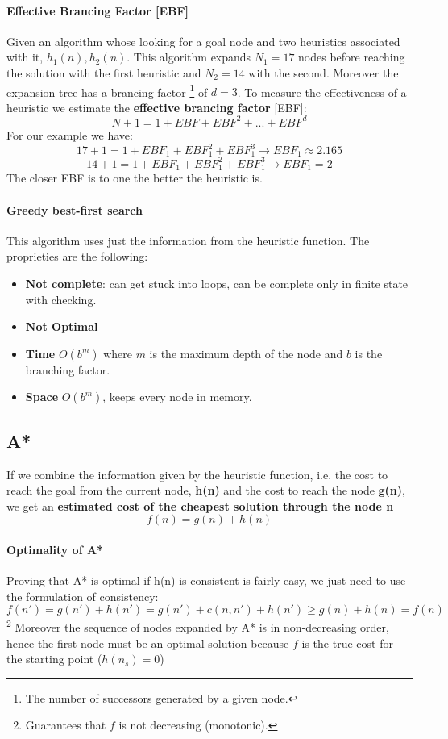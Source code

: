 \documentclass[10pt,a4paper]{article}
\begin{document}
\paragraph{Effective Brancing Factor [EBF]}
Given an algorithm whose looking for a goal node and two heuristics associated with it, $h_1(n),h_2(n)$. This algorithm expands $N_1=17$ nodes before reaching the solution with the first heuristic and $N_2=14$ with the second. Moreover the expansion tree has a brancing factor  \footnote{The number of successors generated by a given node.} of $d=3$. To measure the effectiveness of a heuristic we estimate the \textbf{effective brancing factor} [EBF]:
\[N+1=1+EBF+EBF^2+...+EBF^d\]
For our example we have:
\[17+1=1+EBF_1+EBF^2_1+EBF_1^3\rightarrow EBF_1\approx 2.165\] 
\[14+1=1+EBF_1+EBF^2_1+EBF_1^3\rightarrow EBF_1= 2\]
The closer EBF is to one the better the heuristic is.

\paragraph{Greedy best-first search}
This algorithm uses just the information from the heuristic function. The proprieties are the following:
\begin{itemize}
\item \textbf{Not complete}: can get stuck into loops, can be complete only in finite state with checking.
\item \textbf{Not Optimal}

\item \textbf{Time} $O(b^m)$ where $m$ is the maximum depth of the node and $b$ is the branching factor.
\item \textbf{Space} $O(b^m)$, keeps every node in memory.
\end{itemize}

\subsection{A*} 
If we combine the information given by the heuristic function, i.e. the cost to reach the goal from the current node, \textbf{h(n)} and the cost to reach the node \textbf{g(n)}, we get an \textbf{estimated cost of the cheapest solution through the node n}
\[f(n)=g(n)+h(n)\] 


\paragraph{Optimality of A*}
Proving that A* is optimal if h(n) is consistent is fairly easy, we just need to use the formulation of consistency:
\[f(n')=g(n')+h(n')=g(n')+c(n,n')+h(n') \ge g(n)+h(n)=f(n)\]\footnote{Guarantees that $f$ is not decreasing (monotonic).}
Moreover the sequence of nodes expanded by A* is in non-decreasing order, hence the first node must be an optimal solution because $f$ is the true cost for the starting point ($h(n_s)=0$)
\end{document}

